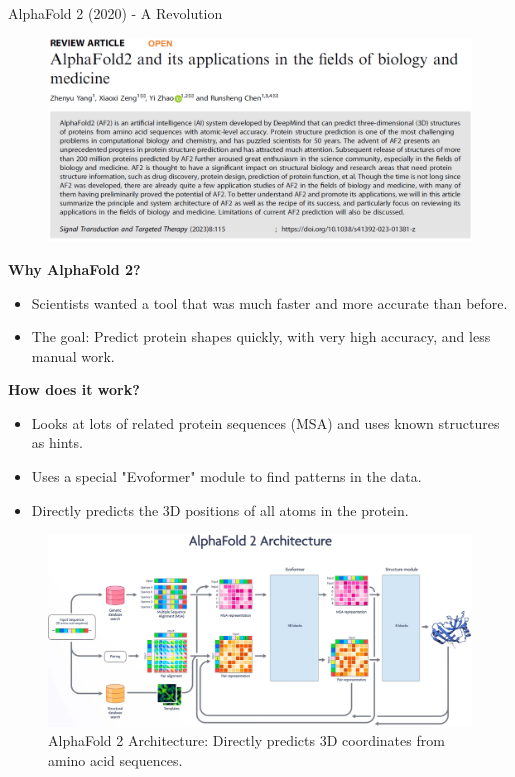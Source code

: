 \begin{frame}[allowframebreaks]{AlphaFold 2 (2020) - A Revolution}
    \begin{figure}
        \centering
        \includegraphics[width=\linewidth,height=0.9\textheight,keepaspectratio]{images/science/alphafold-2-paper.png}
    \end{figure}
    
    \framebreak

    \textbf{Why AlphaFold 2?}
    \begin{itemize}
        \item Scientists wanted a tool that was much faster and more accurate than before.
        \item The goal: Predict protein shapes quickly, with very high accuracy, and less manual work.
    \end{itemize}

    \textbf{How does it work?}
    \begin{itemize}
        \item Looks at lots of related protein sequences (MSA) and uses known structures as hints.
        \item Uses a special "Evoformer" module to find patterns in the data.
        \item Directly predicts the 3D positions of all atoms in the protein.
    \end{itemize}

    \framebreak

    \begin{figure}
        \centering
        \includegraphics[width=\linewidth,height=0.85\textheight,keepaspectratio]{images/science/alphafold-2-architecture.png}
        \caption*{AlphaFold 2 Architecture: Directly predicts 3D coordinates from amino acid sequences.}
    \end{figure}


\end{frame}
